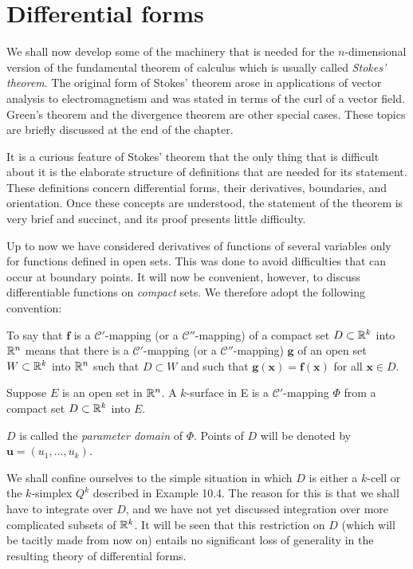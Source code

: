 \section{Differential forms}

We shall now develop some of the machinery that is needed for the $n$-dimensional version of the fundamental theorem of calculus which is usually called \emph{Stokes' theorem}. 
The original form of Stokes' theorem arose in applications of
vector analysis to electromagnetism and was stated in terms of the curl of a
vector field. 
Green's theorem and the divergence theorem are other special cases. 
These topics are briefly discussed at the end of the chapter.

It is a curious feature of Stokes' theorem that the only thing that is difficult
about it is the elaborate structure of definitions that are needed for its statement.
These definitions concern differential forms, their derivatives, boundaries, and
orientation. Once these concepts are understood, the statement of the theorem
is very brief and succinct, and its proof presents little difficulty.

Up to now we have considered derivatives of functions of several variables
only for functions defined in open sets. This was done to avoid difficulties that
can occur at boundary points. It will now be convenient, however, to discuss
differentiable functions on \emph{compact} sets. We therefore adopt the following
convention:

To say that $\mathbf{f}$ is a $\mathscr{C}'$-mapping (or a $\mathscr{C}''$-mapping) of a compact set
$D \subset {\protect\mathbb R}^k$ into ${\protect\mathbb R}^n$ means that there is a $\mathscr{C}'$-mapping (or a $\mathscr{C}''$-mapping) $\mathbf{g}$ of
an open set $W \subset {\protect\mathbb R}^k$ into ${\protect\mathbb R}^n$ such that $D \subset W$ and such that $\mathbf{g(x) = f(x)}$ for all $\mathbf{x} \in D$.

\begin{mydef}
    \label{mydef:10.10}
    Suppose $E$ is an open set in ${\protect\mathbb R}^n$. 
    A $k$-surface in E is a $\mathscr{C}'$-mapping $\Phi$ from a compact set $D \subset {\protect\mathbb R}^k$ into $E$.
    
    $D$ is called the \emph{parameter domain} of $\Phi$. 
    Points of $D$ will be denoted by $\mathbf{u} = (u_1, \dots , u_k)$.
\end{mydef}

We shall confine ourselves to the simple situation in which $D$ is either a $k$-cell or the $k$-simplex $Q^k$ described in Example 10.4. The reason for this is that we shall have to integrate over $D$, 
and we have not yet discussed integration over more complicated subsets of ${\protect\mathbb R}^k$. 
It will be seen that this restriction on $D$ 
(which will be tacitly made from now on) entails no significant loss of generality in the resulting theory of differential forms.

